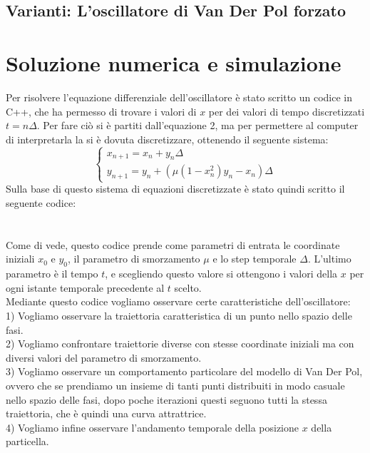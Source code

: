\documentclass[12pt]{article}
\begin{document}
\subsection{Varianti: L'oscillatore di Van Der Pol forzato}

\section{Soluzione numerica e simulazione}
Per risolvere l'equazione differenziale dell'oscillatore è stato scritto un codice in C++, che ha permesso di trovare i valori di $x$ per dei valori di tempo discretizzati $t = n\Delta$. Per fare ciò si è partiti dall'equazione 2, ma per permettere al computer di interpretarla la si è dovuta discretizzare, ottenendo il seguente sistema:
\begin{equation}
	\begin{cases}
	x_{n+1} = x_n + y_n\Delta \\
	y_{n+1} = y_n + \left(\mu(1-x_n^2)y_n - x_n\right)\Delta
	\end{cases}
\end{equation} 
Sulla base di questo sistema di equazioni discretizzate è stato quindi scritto il seguente codice: \\ \\ \\
Come di vede, questo codice prende come parametri di entrata le coordinate iniziali $x_0$ e $y_0$, il parametro di smorzamento $\mu$ e lo step temporale $\Delta$. L'ultimo parametro è il tempo $t$, e scegliendo questo valore si ottengono i valori della $x$ per ogni istante temporale precedente al $t$ scelto. \\
	Mediante questo codice vogliamo osservare certe caratteristiche dell'oscillatore: \\
1) Vogliamo osservare la traiettoria caratteristica di un punto nello spazio delle fasi. \\
2) Vogliamo confrontare traiettorie diverse con stesse coordinate iniziali ma con diversi valori del parametro di smorzamento. \\
3) Vogliamo osservare un comportamento particolare del modello di Van Der Pol, ovvero che se prendiamo un insieme di tanti punti distribuiti in modo casuale nello spazio delle fasi, dopo poche iterazioni questi seguono tutti la stessa traiettoria, che è quindi una curva attrattrice. \\
4) Vogliamo infine osservare l'andamento temporale della posizione $x$ della particella. \\
\end{document}
